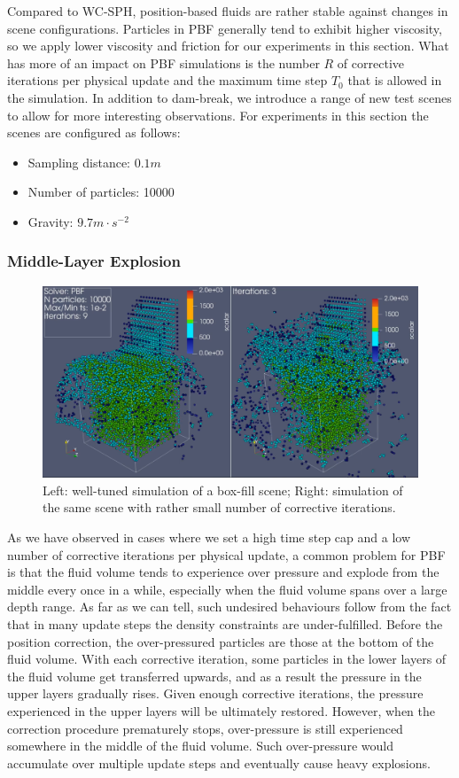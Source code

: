 \documentclass[
	11pt, 
	DIV10,
	ngerman,
	a4paper, 
	oneside, 
	headings=normal, 
	captions=tableheading,
	final, 
	numbers=noenddot
]{scrartcl}
\begin{document}
Compared to WC-SPH, position-based fluids are rather stable against changes in scene configurations. Particles in PBF generally tend to exhibit higher viscosity, so we apply lower viscosity and friction for our experiments in this section. What has more of an impact on PBF simulations is the number $ R $ of corrective iterations per physical update and the maximum time step $ T_{0} $ that is allowed in the simulation. In addition to dam-break, we introduce a range of new test scenes to allow for more interesting observations. For experiments in this section the scenes are configured as follows:

\begin{itemize}
    \item Sampling distance: $ 0.1m $
    \item Number of particles: 10000
    \item Gravity: $ 9.7m \cdot s^{-2} $
\end{itemize}

\subsubsection{Middle-Layer Explosion}

\begin{figure}
    \centering
    \includegraphics[width=.6\textwidth]{pics/pbf_iter.png}
    \caption{Left: well-tuned simulation of a box-fill scene; Right: simulation of the same scene with rather small number of corrective iterations.}
    \label{fig:boxfill}
\end{figure}

As we have observed in cases where we set a high time step cap and a low number of corrective iterations per physical update, a common problem for PBF is that the fluid volume tends to experience over pressure and explode from the middle every once in a while, especially when the fluid volume spans over a large depth range. As far as we can tell, such undesired behaviours follow from the fact that in many update steps the density constraints are under-fulfilled. Before the position correction, the over-pressured particles are those at the bottom of the fluid volume. With each corrective iteration, some particles in the lower layers of the fluid volume get transferred upwards, and as a result the pressure in the upper layers gradually rises. Given enough corrective iterations, the pressure experienced in the upper layers will be ultimately restored. However, when the correction procedure prematurely stops, over-pressure is still experienced somewhere in the middle of the fluid volume. Such over-pressure would accumulate over multiple update steps and eventually cause heavy explosions.
\end{document}
